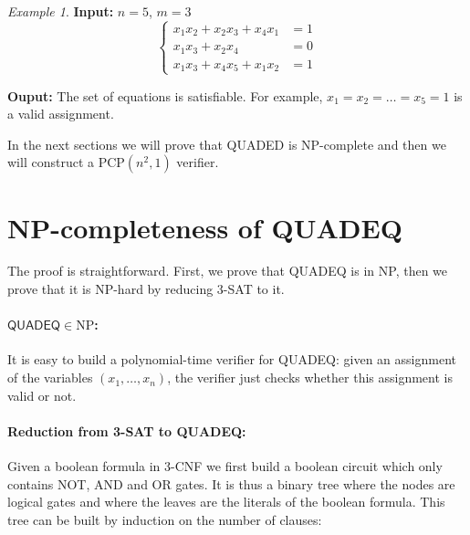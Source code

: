 \documentclass[a4paper,10pt]{article}
\newcommand{\NP}{\mathrm{NP}}
\newcommand{\PCP}{\mathrm{PCP}}
\theoremstyle{remark}
\newtheorem*{example}{Example}
\begin{document}
\begin{example}
\textbf{Input:} $n=5$, $m=3$
\begin{displaymath}
\left\{\begin{array}{rl}
x_1x_2 + x_2x_3 + x_4x_1 & = 1\\
x_1x_3 + x_2x_4 & = 0\\
x_1x_3 + x_4x_5 + x_1x_2 & = 1        
\end{array}\right.
\end{displaymath}

\textbf{Ouput:} The set of equations is satisfiable. For example, $x_1 = x_2 =
  \ldots = x_5 = 1$ is a valid assignment.
\end{example}

In the next sections we will prove that \textsf{QUADED} is NP-complete and then
we will construct a $\PCP(n^2,1)$ verifier.

\section{NP-completeness of \textsf{QUADEQ}}

The proof is straightforward. First, we prove that \textsf{QUADEQ} is in
NP, then we prove that it is NP-hard by reducing \textsf{3-SAT} to it.

\paragraph{$\textsf{QUADEQ}\in\NP$:} It is easy to build a polynomial-time
verifier for \textsf{QUADEQ}: given an assignment of the variables
$(x_1,\ldots,x_n)$, the verifier just checks whether this assignment is valid
or not.

\paragraph{Reduction from \textsf{3-SAT} to \textsf{QUADEQ}:} Given a boolean
formula in 3-CNF we first build a boolean circuit which only contains
\textsf{NOT}, \textsf{AND} and \textsf{OR} gates. It is thus a binary tree where
the nodes are logical gates and where the leaves are the literals of the
boolean formula. This tree can be built by induction on the number of clauses:
\end{document}
